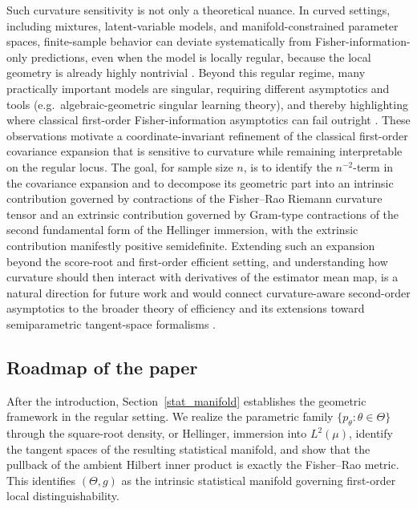 \documentclass[11pt,letterpaper]{amsart}
\numberwithin{equation}{section}
\theoremstyle{plain}
\theoremstyle{definition}
\theoremstyle{remark}
\begin{document}
Such curvature sensitivity is not only a theoretical nuance. In curved settings, including mixtures, latent-variable models, and manifold-constrained parameter spaces, finite-sample behavior can deviate systematically from Fisher-information-only predictions, even when the model is locally regular, because the local geometry is already highly nontrivial \cite{KassVos2011,Marriott2002}. Beyond this regular regime, many practically important models are singular, requiring different asymptotics and tools (e.g.\ algebraic-geometric singular learning theory), and thereby highlighting where classical first-order Fisher-information asymptotics can fail outright \cite{Watanabe2009}. These observations motivate a coordinate-invariant refinement of the classical first-order covariance expansion that is sensitive to curvature while remaining interpretable on the regular locus. The goal, for sample size \(n\), is to identify the \(n^{-2}\)-term in the covariance expansion and to decompose its geometric part into an intrinsic contribution governed by contractions of the Fisher--Rao Riemann curvature tensor and an extrinsic contribution governed by Gram-type contractions of the second fundamental form of the Hellinger immersion, with the extrinsic contribution manifestly positive semidefinite. Extending such an expansion beyond the score-root and first-order efficient setting, and understanding how curvature should then interact with derivatives of the estimator mean map, is a natural direction for future work and would connect curvature-aware second-order asymptotics to the broader theory of efficiency and its extensions toward semiparametric tangent-space formalisms \cite{BickelKlaassen1993,KassVos2011,VanDerVaart2000}.






\subsection{Roadmap of the paper}

After the introduction, Section~\ref{stat_manifold} establishes the geometric framework in the regular setting. We realize the parametric family \(\{p_\theta:\theta\in\Theta\}\) through the square-root density, or Hellinger, immersion into \(L^2(\mu)\), identify the tangent spaces of the resulting statistical manifold, and show that the pullback of the ambient Hilbert inner product is exactly the Fisher--Rao metric. This identifies \((\Theta,g)\) as the intrinsic statistical manifold governing first-order local distinguishability.
\end{document}
